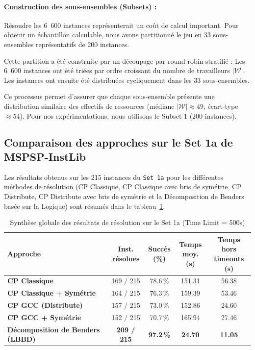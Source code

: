 \paragraph{Construction des sous-ensembles (Subsets) :}
Résoudre les 6~600 instances représenterait un coût de calcul important. Pour obtenir un échantillon calculable, nous avons partitionné le jeu en 33 sous-ensembles représentatifs de 200 instances.

Cette partition a été construite par un découpage par round-robin stratifié : Les 6~600 instances ont été triées par ordre croissant du nombre de travailleurs $|\mathcal{W}|$. Les instances ont ensuite été distribuées cycliquement dans les 33 sous-ensembles.

Ce processus permet d'assurer que chaque sous-ensemble présente une distribution similaire des effectifs de ressources (médiane $|\mathcal{W}| \approx 49$, écart-type $\approx 54$). Pour nos expérimentations, nous utilisons le Subset 1 (200 instances).

\subsection{Comparaison des approches sur le Set 1a de MSPSP-InstLib}

Les résultats obtenus sur les 215 instances du \texttt{Set 1a} pour les différentes méthodes de résolution (CP Classique, CP Classique avec bris de symétrie, CP Distribute, CP Distribute avec bris de symétrie et la Décomposition de Benders basée sur la Logique) sont résumés dans le tableau~\ref{tab:results_summary_set1a}.

\begin{table}[H]
    \centering
    \caption{Synthèse globale des résultats de résolution sur le Set 1a (Time Limit = 500s)}
    \label{tab:results_summary_set1a}
    \small
    \renewcommand{\cellalign}{cc}
    \begin{tabularx}{\textwidth}{|X|c|c|c|c|}
        \hline
        \textbf{Approche} & \makecell{\textbf{Inst.} \\ \textbf{résolues}} & \makecell{\textbf{Succès} \\ \textbf{(\%)}} & \makecell{\textbf{Temps} \\ \textbf{moy. (s)}} & \makecell{\textbf{Temps hors} \\ \textbf{timeouts (s)}} \\ \hline
        \textbf{CP Classique} & 169 / 215 & 78.6\,\% & 151.31 & 56.38 \\ \hline
        \textbf{CP Classique + Symétrie} & 164 / 215 & 76.3\,\% & 159.39 & 53.46 \\ \hline
        \textbf{CP GCC (Distribute)} & 157 / 215 & 73.0\,\% & 152.86 & 24.60 \\ \hline
        \textbf{CP GCC + Symétrie} & 152 / 215 & 70.7\,\% & 165.94 & 27.46 \\ \hline
        \textbf{Décomposition de Benders (LBBD)} & \textbf{209 / 215} & \textbf{97.2\,\%} & \textbf{24.70} & \textbf{11.05} \\ \hline
    \end{tabularx}
\end{table}

